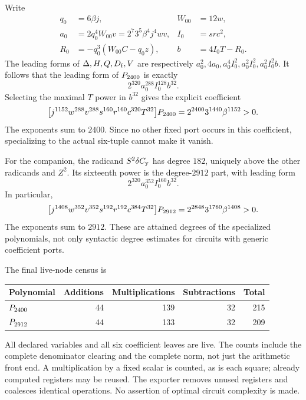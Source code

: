 Write
\begin{align*}
 q_0&=6\beta j,& W_{00}&=12w,\\
 a_0&=2q_0^4W_{00}v
     =2^7 3^5\beta^4j^4wv,& I_0&=src^2,\\
 R_0&=-q_0^3(W_{00}C-q_0z),& b&=4I_0T-R_0.
\end{align*}
The leading forms of $\Delta,H,Q,D_{\mathrm f},V$ are respectively
$a_0^2,4a_0,a_0^4I_0^2,a_0^2I_0^2,a_0^2I_0^2b$.
It follows that the leading form of $P_{2400}$ is exactly
\begin{equation}\label{eq:primary-leading}
 2^{320}a_0^{288}I_0^{128}b^{32}.
\end{equation}
Selecting the maximal $T$ power in $b^{32}$ gives the explicit coefficient
\begin{equation}\label{eq:primary-coefficient}
 \bigl[j^{1152}w^{288}v^{288}s^{160}r^{160}c^{320}T^{32}\bigr]
 P_{2400}
 =2^{2400}3^{1440}\beta^{1152}>0.
\end{equation}
The exponents sum to $2400$. Since no other fixed port occurs in this
coefficient, specializing to the actual six-tuple cannot make it vanish.

For the companion, the radicand $S^2\delta C_{\mathrm y}$ has degree $182$,
uniquely above the other radicands and $Z^2$. Its sixteenth power is
the degree-$2912$ part, with leading form
\[
 2^{320}a_0^{352}I_0^{160}b^{32}.
\]
In particular,
\begin{equation}\label{eq:companion-coefficient}
 \bigl[j^{1408}w^{352}v^{352}s^{192}r^{192}c^{384}T^{32}\bigr]
 P_{2912}
 =2^{2848}3^{1760}\beta^{1408}>0.
\end{equation}
The exponents sum to $2912$. These are attained degrees of the
specialized polynomials, not only syntactic degree estimates for circuits
with generic coefficient ports.

The final live-node census is
\begin{center}
\begin{tabular}{@{}lrrrr@{}}\toprule
Polynomial & Additions & Multiplications & Subtractions & Total\\
\midrule
$P_{2400}$ &44&139&32&215\\
$P_{2912}$ &44&133&32&209\\\bottomrule
\end{tabular}
\end{center}
All declared variables and all six coefficient leaves are live. The
counts include the complete denominator clearing and the complete norm,
not just the arithmetic front end. A multiplication by a fixed scalar
is counted, as is each square; already computed registers may be reused.
The exporter removes unused registers and coalesces identical operations.
No assertion of optimal circuit complexity is made.
